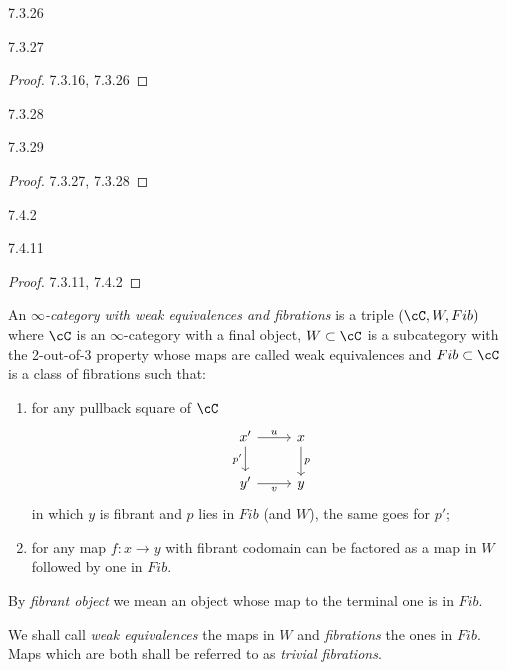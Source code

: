 \documentclass[a4paper,12pt]{scrartcl}
\begin{document}
\begin{cor}
  7.3.26
\end{cor}

\begin{cor}
  7.3.27
\end{cor}
\begin{proof}
  7.3.16, 7.3.26
\end{proof}

\begin{cor}
  7.3.28
\end{cor}

\begin{cor}
  7.3.29
\end{cor}
\begin{proof}
  7.3.27, 7.3.28
\end{proof}

\begin{prop}
  7.4.2
\end{prop}

\begin{prop}
  7.4.11
\end{prop}
\begin{proof}
  7.3.11, 7.4.2
\end{proof}

\begin{defn}
  An \emph{$\infty$-category with weak equivalences and fibrations} is a triple
  $(\cC,W,Fib)$ where $\cC$ is an $\infty$-category with a final object,
  $W\subset\cC$ is a subcategory with the 2-out-of-3 property whose maps are
  called weak equivalences and $Fib\subset\cC$ is a class of fibrations such
  that:
  \begin{enumerate}
    \item for any pullback square of $\cC$
      \[\begin{tikzcd}
        {x'} & x \\
        {y'} & y
        \arrow["p", from=1-2, to=2-2]
        \arrow["{p'}"', from=1-1, to=2-1]
        \arrow["v"', from=2-1, to=2-2]
        \arrow["u", from=1-1, to=1-2]
      \end{tikzcd}\]
      in which $y$ is fibrant and $p$ lies in $Fib$ (and $W$), the same goes
      for $p'$;
    \item for any map $f\colon x\rightarrow y$ with fibrant codomain can be
      factored as a map in $W$ followed by one in $Fib$.
  \end{enumerate}
  By \emph{fibrant object} we mean an object whose map to the terminal one is in
  $Fib$.

  We shall call \emph{weak equivalences} the maps in $W$ and \emph{fibrations}
  the ones in $Fib$. Maps which are both shall be referred to as \emph{trivial
  fibrations}.
\end{defn}
\end{document}
